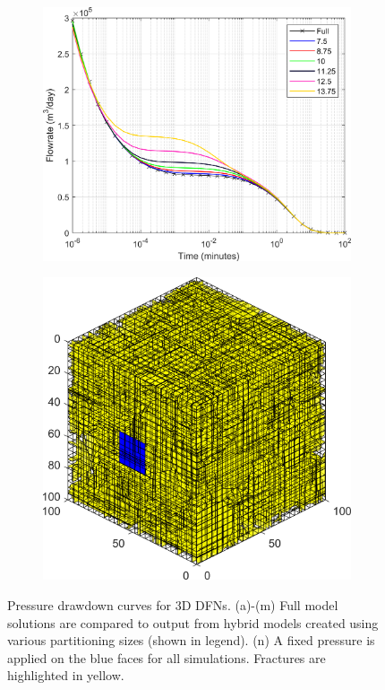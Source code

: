 \documentclass[Supplementary.tex]{subfiles}
\begin{document}
\begin{figure}[ht]
\begin{subfigure}{0.3\textwidth}
        \label{fig:3D_DD_12}
     \end{subfigure}
     \\
     \begin{subfigure}{0.3\textwidth}
        \includegraphics[width=\textwidth]{3D_DD/Plot_Drawdown_Case_13_nohead.png}
        \label{fig:3D_DD_13}
     \end{subfigure}
     \begin{subfigure}{0.25\textwidth}
        \includegraphics[width=\textwidth]{3D_DD/Boundarycondition.png}
        \label{fig:3D_BC}
     \end{subfigure}
     \caption{Pressure drawdown curves for 3D DFNs. (a)-(m) Full model solutions are compared to output from hybrid models created using various partitioning sizes (shown in legend). (n) A fixed pressure is applied on the blue faces for all simulations. Fractures are highlighted in yellow.}
     \label{fig:3D_DD}
 \end{figure}
\end{document}
